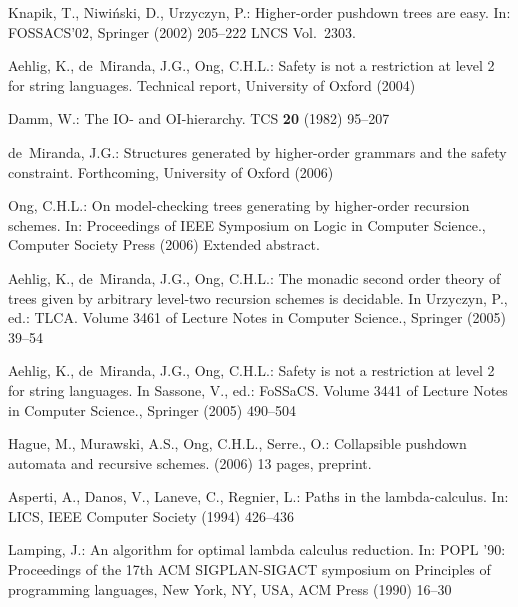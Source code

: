 \documentclass{llncs}
\begin{document}

%
\begin{thebibliography}{10}

Knapik, T., Niwi{\'n}ski, D., Urzyczyn, P.:
\newblock Higher-order pushdown trees are easy.
\newblock In: FOSSACS'02, Springer (2002)  205--222 LNCS Vol.~2303.

Aehlig, K., de~Miranda, J.G., Ong, C.H.L.:
\newblock Safety is not a restriction at level 2 for string languages.
\newblock Technical report, University of Oxford (2004)

Damm, W.:
\newblock The {IO-} and {OI}-hierarchy.
\newblock TCS \textbf{20} (1982)  95--207

de~Miranda, J.G.:
\newblock Structures generated by higher-order grammars and the safety
  constraint.
\newblock Forthcoming, University of Oxford (2006)

Ong, C.H.L.:
\newblock On model-checking trees generating by higher-order recursion schemes.
\newblock In: Proceedings of IEEE Symposium on Logic in Computer Science.,
  Computer Society Press (2006) Extended abstract.

Aehlig, K., de~Miranda, J.G., Ong, C.H.L.:
\newblock The monadic second order theory of trees given by arbitrary level-two
  recursion schemes is decidable.
\newblock In Urzyczyn, P., ed.: TLCA. Volume 3461 of Lecture Notes in Computer
  Science., Springer (2005)  39--54

Aehlig, K., de~Miranda, J.G., Ong, C.H.L.:
\newblock Safety is not a restriction at level 2 for string languages.
\newblock In Sassone, V., ed.: FoSSaCS. Volume 3441 of Lecture Notes in
  Computer Science., Springer (2005)  490--504

Hague, M., Murawski, A.S., Ong, C.H.L., Serre., O.:
\newblock Collapsible pushdown automata and recursive schemes.
\newblock (2006) 13 pages, preprint.

Asperti, A., Danos, V., Laneve, C., Regnier, L.:
\newblock Paths in the lambda-calculus.
\newblock In: LICS, IEEE Computer Society (1994)  426--436

Lamping, J.:
\newblock An algorithm for optimal lambda calculus reduction.
\newblock In: POPL '90: Proceedings of the 17th ACM SIGPLAN-SIGACT symposium on
  Principles of programming languages, New York, NY, USA, ACM Press (1990)
  16--30


\end{thebibliography}
\end{document}
